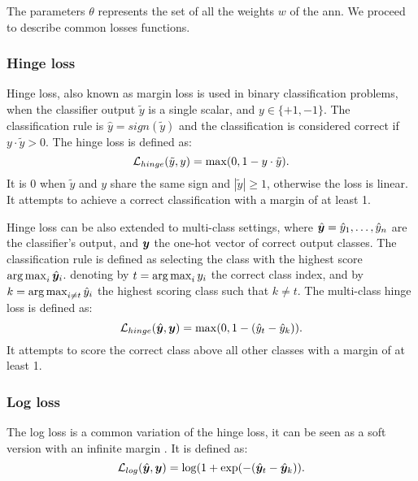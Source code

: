 The parameters $\theta$ represents the set of all the weights $w$ of
the \ac{ann}. 
We proceed to describe common losses functions.

\subsubsection{Hinge loss}
Hinge loss, also known as margin loss is used in binary classification
problems, when the classifier output $\tilde{y}$ is a single scalar, and
$y\in\{+1,-1\}$. The classification rule is $\hat{y}=sign(\tilde{y})$
and the classification is considered correct if
$y\cdot\tilde{y}>0$. The hinge loss is defined as:
\begin{equation*}
  \mathcal{L}_{hinge}(\tilde{y},y)=\max(0,1-y\cdot\tilde{y}).
\end{equation*}
It is $0$ when $\tilde{y}$ and $y$ share the same sign and
$|\tilde{y}|\geq 1$, otherwise the loss is linear. It attempts to
achieve a correct classification with a margin of at least 1.

Hinge loss can be also extended to multi-class settings, where
$\hat{\bm{y}}=\hat{y}_1,\dots,\hat{y}_n$ are the classifier's
output, and $\bm{y}$ the one-hot vector of correct output
classes. The classification rule is defined as selecting the class
with the highest score $\operatorname*{arg\,max}_i\hat{\bm{y}}_i$. denoting by
$t=\operatorname*{arg\,max}_iy_i$ the correct class index, and by $k=\operatorname*{arg\,max}_{i\neq
  t}\hat{y}_i$ the highest scoring class such that $k\neq t$. The
multi-class hinge loss is defined as:
\begin{equation*}
  \mathcal{L}_{hinge}(\hat{\bm{y}},
  \bm{y})=\max(0,1-(\hat{y}_t-\hat{y}_k)).
\end{equation*}
It attempts to score the correct class above all other classes with a
margin of at least 1.

\subsubsection{Log loss}
The log loss is a common variation of the hinge loss, it can be seen
as a soft version with an infinite margin \cite{lecun2006tutorial}. It
is defined as:
\begin{equation*}
  \mathcal{L}_{log}(\hat{\bm{y}}, \bm{y}) =
  \log(1+\exp(-(\hat{\bm{y}}_t-\hat{\bm{y}}_k)). 
\end{equation*}

